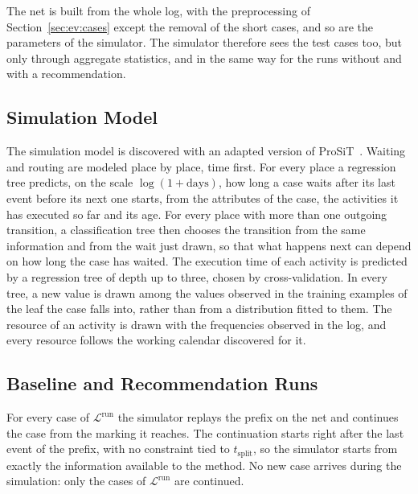 The net is built from the whole log, with the preprocessing of
Section~\ref{sec:ev:cases} except the removal of the short cases, and so are
the parameters of the simulator. The simulator therefore sees the test cases
too, but only through aggregate statistics, and in the same way for the
runs without and with a recommendation.

\subsection{Simulation Model}
\label{subsec:ev:sim:model}
The simulation model is discovered with an adapted version of
ProSiT~\cite{vinci2025prosit}. Waiting and routing are modeled place by
place, time first. For every place a regression tree predicts, on the scale
$\log(1 + \text{days})$, how long a case waits after its last event before
its next one starts, from the attributes of the case, the activities it has
executed so far and its age. For every place with more than one outgoing
transition, a classification tree then chooses the transition from the same
information and from the wait just drawn, so that what happens next can
depend on how long the case has waited. The execution time of each activity
is predicted by a regression tree of depth up to three, chosen by
cross-validation. In every tree, a new value is drawn among the values
observed in the training examples of the leaf the case falls into, rather
than from a distribution fitted to them. The resource of an activity is
drawn with the frequencies observed in the log, and every resource follows
the working calendar discovered for it.

\subsection{Baseline and Recommendation Runs}
\label{subsec:ev:sim:runs}
For every case of $\mathcal{L}^{\mathrm{run}}$ the simulator replays the
prefix on the net and continues the case from the marking it reaches. The
continuation starts right after the last event of the prefix, with no
constraint tied to $t_{\mathrm{split}}$, so the simulator starts from exactly
the information available to the method. No new case arrives during the
simulation: only the cases of $\mathcal{L}^{\mathrm{run}}$ are continued.

